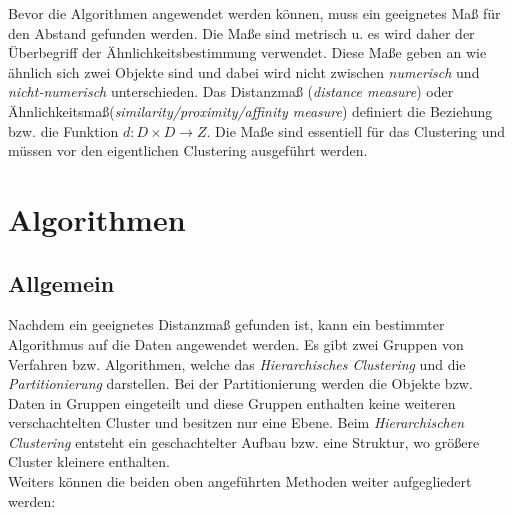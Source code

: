 Bevor die Algorithmen angewendet werden können, muss ein geeignetes Maß für den Abstand gefunden werden.  Die Maße sind metrisch u. es wird daher der Überbegriff der Ähnlichkeitsbestimmung verwendet. Diese Maße geben an wie ähnlich sich zwei Objekte sind und  dabei wird nicht zwischen \textit{numerisch} und \textit{nicht-numerisch} unterschieden. Das Distanzmaß (\textit{distance measure}) oder Ähnlichkeitsmaß(\textit{similarity/proximity/affinity measure}) definiert die Beziehung bzw. die Funktion \(d: D \times D \rightarrow Z \). Die Maße sind essentiell für das Clustering und müssen vor den eigentlichen Clustering ausgeführt werden.\cite{fasulo99}

\section{Algorithmen}

\subsection{Allgemein}
Nachdem ein geeignetes Distanzmaß gefunden ist, kann ein bestimmter Algorithmus auf die Daten angewendet werden. Es gibt zwei Gruppen von Verfahren bzw. Algorithmen, welche das  \textit{Hierarchisches Clustering} und die \textit{Partitionierung} darstellen. Bei der Partitionierung werden die Objekte bzw. Daten in Gruppen eingeteilt und diese Gruppen enthalten keine weiteren verschachtelten Cluster und besitzen nur eine Ebene. Beim \textit{Hierarchischen Clustering} entsteht ein geschachtelter Aufbau bzw. eine Struktur, wo größere Cluster kleinere enthalten.\cite{fasulo99}\\

Weiters können die beiden oben angeführten Methoden weiter aufgegliedert werden:\cite{fasulo99}

